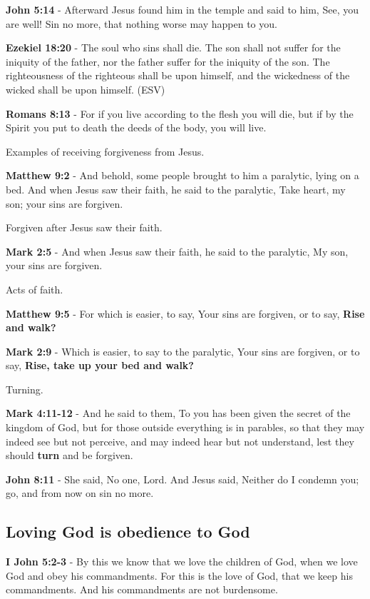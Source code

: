 \documentclass[11pt]{article}
\begin{document}
\textbf{John 5:14} - Afterward Jesus found him in the temple and said to him, See, you are well! Sin no more, that nothing worse may happen to you.

\textbf{Ezekiel 18:20} - The soul who sins shall die. The son shall not suffer for the iniquity of the father, nor the father suffer for the iniquity of the son. The righteousness of the righteous shall be upon himself, and the wickedness of the wicked shall be upon himself. (ESV)

\textbf{Romans 8:13} - For if you live according to the flesh you will die, but if by the Spirit you put to death the deeds of the body, you will live.

Examples of receiving forgiveness from Jesus.

\textbf{Matthew 9:2} - And behold, some people brought to him a paralytic, lying on a bed. And when Jesus saw their faith, he said to the paralytic, Take heart, my son; your sins are forgiven.

Forgiven after Jesus saw their faith.

\textbf{Mark 2:5} - And when Jesus saw their faith, he said to the paralytic, My son, your sins are forgiven.

Acts of faith.

\textbf{Matthew 9:5} - For which is easier, to say, Your sins are forgiven, or to say, \textbf{Rise and walk?}

\textbf{Mark 2:9} - Which is easier, to say to the paralytic, Your sins are forgiven, or to say, \textbf{Rise, take up your bed and walk?}

Turning.

\textbf{Mark 4:11-12} - And he said to them, To you has been given the secret of the kingdom of God, but for those outside everything is in parables, so that they may indeed see but not perceive, and may indeed hear but not understand, lest they should \textbf{turn} and be forgiven.

\textbf{John 8:11} - She said, No one, Lord. And Jesus said, Neither do I condemn you; go, and from now on sin no more.

\subsection{Loving God is obedience to God}
\label{sec:orgf2b6690}
\textbf{I John 5:2-3} - By this we know that we love the children of God, when we love God and obey his commandments. For this is the love of God, that we keep his commandments. And his commandments are not burdensome.
\end{document}
